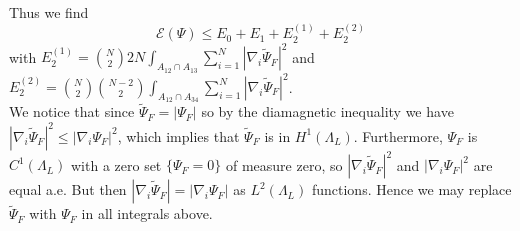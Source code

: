\documentclass[a4paper,11pt]{article}
\newcommand{\abs}[1]{\left\lvert #1 \right\rvert}
\numberwithin{equation}{section}
\begin{document}
	Thus we find \begin{equation}\label{EqBound1}
	\mathcal{E}(\Psi)\leq E_0+E_1+E_2^{(1)}+E_2^{(2)}
	\end{equation}
	with $ E_2^{(1)}=\binom{N}{2}2N\int_{A_{12}\cap A_{13}}\sum_{i=1}^{N}\abs{\nabla_i\tilde{\Psi}_F}^2 $ and $ E_2^{(2)}=\binom{N}{2}\binom{N-2}{2}\int_{A_{12}\cap A_{34}}\sum_{i=1}^{N}\abs{\nabla_i\tilde{\Psi}_F}^2 $.\\
	We notice that since $ \tilde{\Psi}_F=\abs{\Psi_F} $ so by the diamagnetic inequality we have $ \abs{\nabla_i\tilde{\Psi}_F}^2\leq \abs{\nabla_i\Psi_F}^2 $, which implies that $ \tilde{\Psi}_F $ is in $ H^{1}(\Lambda_L) $. Furthermore, $ \Psi_F $ is $ C^{1}(\Lambda_L) $ with a zero set $ \{\Psi_F=0\} $ of measure zero, so $ \abs{\nabla_i\tilde{\Psi}_F}^2 $ and $ \abs{\nabla_i\Psi_F}^2 $ are equal a.e. But then $ \abs{\nabla_i\tilde{\Psi}_F}=\abs{\nabla_i\Psi_F} $ as $ L^{2}(\Lambda_L) $ functions. Hence we may replace $ \tilde{\Psi}_F $ with $ \Psi_F $ in all integrals above.
\end{document}
